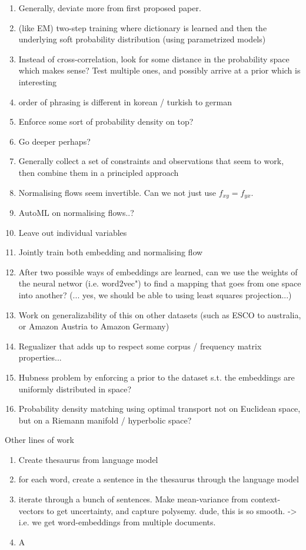 \documentclass[a4paper,12pt,twoside,openright]{report}
\begin{document}
\begin{enumerate}
\item Generally, deviate more from first proposed paper.
\item (like EM) two-step training where dictionary is learned and then the underlying soft probability distribution (using parametrized models)
\item Instead of cross-correlation, look for some distance in the probability space which makes sense? Test multiple ones, and possibly arrive at a prior which is interesting
\item order of phrasing is different in korean / turkish to german
\item Enforce some sort of probability density on top?
\item Go deeper perhaps?
\item Generally collect a set of constraints and observations that seem to work, then combine them in a principled approach
\item Normalising flows seem invertible. Can we not just use $f_{xy} = f_{yx}$.
\item AutoML on normalising flows..?
\item Leave out individual variables
\item Jointly train both embedding and normalising flow
\item After two possible ways of embeddings are learned, can we use the weights of the neural networ (i.e. word2vec") to find a mapping that goes from one space into another? (... yes, we should be able to using least squares projection...)
\item Work on generalizability of this on other datasets (such as ESCO to australia, or Amazon Austria to Amazon Germany)
\item Regualizer that adds up to respect some corpus / frequency matrix properties...
\item Hubness problem by enforcing a prior to the dataset s.t. the embeddings are uniformly distributed in space?
\item Probability density matching using optimal transport not on Euclidean space, but on a Riemann manifold / hyperbolic space?
\end{enumerate}

Other lines of work

\begin{enumerate}
\item Create thesaurus from language model
\item for each word, create a sentence in the thesaurus through the language model
\item iterate through a bunch of sentences. Make mean-variance from context-vectors to get uncertainty, and capture polysemy. dude, this is so smooth. -> i.e. we get word-embeddings from multiple documents.
\item A
\end{enumerate}
\end{document}

